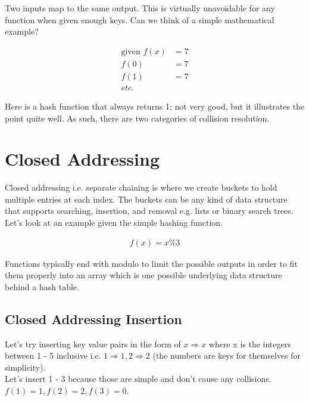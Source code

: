 \documentclass[11pt]{book}
\begin{document}
		\noindent Two inputs map to the same output. This is virtually unavoidable for
		any function when given enough keys. Can we think of a simple mathematical example?

		\begin{align*}
			\text{given } f(x) &= 7 \\
			f(0) &= 7 \\
			f(1) &= 7 \\
			etc.
		\end{align*}

		\noindent Here is a hash function that always returns 1; not very good, but it
		illustrates the point quite well. As such, there are two categories of
		collision resolution.

	\section{Closed Addressing}
		Closed addressing i.e. separate chaining is where we create buckets to hold
		multiple entries at each index. The buckets can be any kind of data structure
		that supports searching, insertion, and removal e.g. lists or binary search
		trees. Let's look at an example given the simple hashing function.

		\begin{align*}
			f(x) = x \% 3
		\end{align*}

		\noindent Functions typically end with modulo to limit the possible outputs in
		order to fit them properly into an array which is one possible underlying data
		structure behind a hash table.
		
	\subsection{Closed Addressing Insertion}
		Let's try inserting key value pairs in the form of $x \Rightarrow x$ where x is the integers
		between 1 - 5 inclusive i.e. $1 \Rightarrow 1, 2 \Rightarrow 2$ (the numbers are keys for themselves
		for simplicity).\\

		\noindent Let's insert 1 - 3 because those are simple and don't cause any
		collisions. $f(1) = 1, f(2) = 2, f(3) = 0$.
\end{document}
